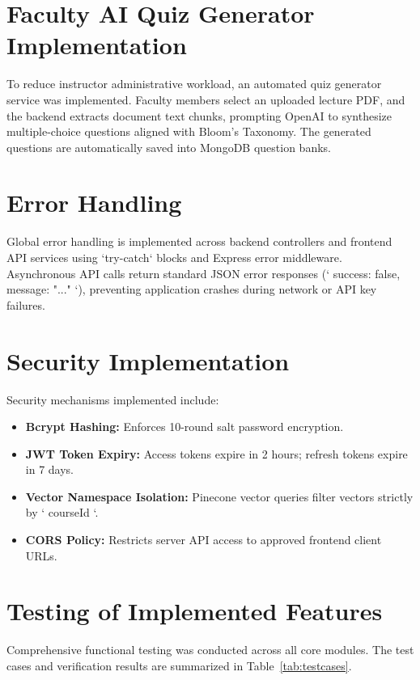 \section{Faculty AI Quiz Generator Implementation}

To reduce instructor administrative workload, an automated quiz generator service was implemented. Faculty members select an uploaded lecture PDF, and the backend extracts document text chunks, prompting OpenAI to synthesize multiple-choice questions aligned with Bloom's Taxonomy. The generated questions are automatically saved into MongoDB question banks.

\section{Error Handling}

Global error handling is implemented across backend controllers and frontend API services using `try-catch` blocks and Express error middleware. Asynchronous API calls return standard JSON error responses (`{ success: false, message: "..." }`), preventing application crashes during network or API key failures.

\section{Security Implementation}

Security mechanisms implemented include:
\begin{itemize}
    \item \textbf{Bcrypt Hashing:} Enforces 10-round salt password encryption.
    \item \textbf{JWT Token Expiry:} Access tokens expire in 2 hours; refresh tokens expire in 7 days.
    \item \textbf{Vector Namespace Isolation:} Pinecone vector queries filter vectors strictly by `{ courseId }`.
    \item \textbf{CORS Policy:} Restricts server API access to approved frontend client URLs.
\end{itemize}

\section{Testing of Implemented Features}

Comprehensive functional testing was conducted across all core modules. The test cases and verification results are summarized in Table~\ref{tab:testcases}.

